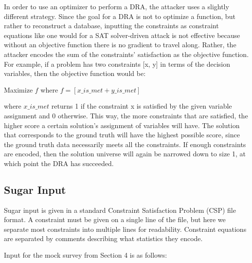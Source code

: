 \documentclass[5p,times,11pt]{elsarticle}
\begin{document}
In order to use an optimizer to perform a DRA, the attacker uses a slightly different strategy. Since the goal for a DRA is not to optimize a function, but rather to reconstruct a database, inputting the constraints as constraint equations like one would for a SAT solver-driven attack is not effective because without an objective function there is no gradient to travel along. Rather, the attacker encodes the sum of the constraints' satisfaction as the objective function. For example, if a problem has two constraints [x, y] in terms of the decision variables, then the objective function would be:
\begin{center}
Maximize $f$ where $f = [x\_is\_met + y\_is\_met]$
\end{center}
where $x\_is\_met$ returns 1 if the constraint x is satisfied by the given variable assignment and 0 otherwise. This way, the more constraints that are satisfied, the higher score a certain solution's assignment of variables will have. The solution that corresponds to the ground truth will have the highest possible score, since the ground truth data necessarily meets all the constraints. If enough constraints are encoded, then the solution universe will again be narrowed down to size 1, at which point the DRA has succeeded.

\subsection{Sugar Input}

Sugar input is given in a standard Constraint Satisfaction Problem (CSP) file format. A constraint must be given on a single line of the file, but here we separate most constraints into multiple lines for readability. Constraint equations are separated by comments describing what statistics they encode.

Input for the mock survey from Section 4 is as follows:
\end{document}
